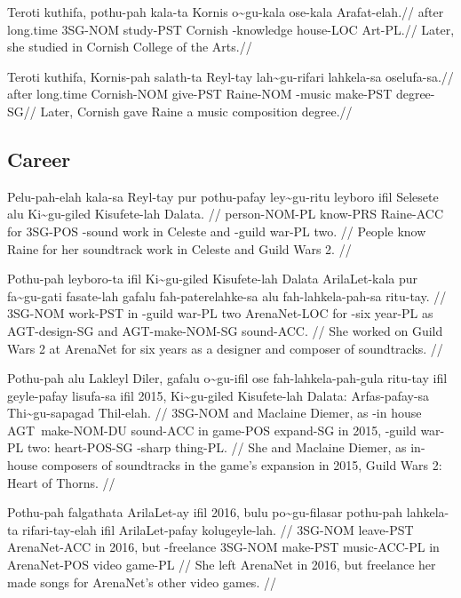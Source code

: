 \ex
\begingl
\gla  Teroti kuthifa,  pothu-pah kala-ta  Kornis o\~{}gu-kala ose-kala  Arafat-elah.//
\glb  after  long.time 3SG-NOM study-PST Cornish \agradj-knowledge house-LOC Art-PL.//
\glft Later, she studied in Cornish College of the Arts.//
\endgl
\xe

\ex
\begingl
\gla  Teroti kuthifa,  Kornis-pah salath-ta Reyl-tay  lah\~{}gu-rifari lahkela-sa oselufa-sa.//
\glb  after  long.time Cornish-NOM give-PST Raine-NOM  \agradj-music make-PST degree-SG//
\glft Later, Cornish gave Raine a music composition degree.//
\endgl
\xe

\subsection{Career}
\ex
\begingl
\gla Pelu-pah-elah kala-sa Reyl-tay pur pothu-pafay ley\~{}gu-ritu leyboro ifil Selesete alu Ki\~{}gu-giled Kisufete-lah Dalata. //
\glb person-NOM-PL know-PRS Raine-ACC for 3SG-POS \agradj-sound work in Celeste and \agradj-guild war-PL two. //
\glft People know Raine for her soundtrack work in Celeste and Guild Wars 2. //
\endgl
\xe

\ex
\begingl
\gla Pothu-pah leyboro-ta ifil Ki\~{}gu-giled Kisufete-lah Dalata  ArilaLet-kala pur fa\~{}gu-gati fasate-lah gafalu  fah-paterelahke-sa alu fah-lahkela-pah-sa  ritu-tay. //
\glb 3SG-NOM work-PST in \agradj-guild war-PL two  ArenaNet-LOC for \agradj-six year-PL as  AGT-design-SG and AGT-make-NOM-SG  sound-ACC. //
\glft She worked on Guild Wars 2 at ArenaNet for six years as a designer and composer of soundtracks. //
\endgl
\xe

\ex
\begingl
\gla Pothu-pah alu Lakleyl Diler, gafalu o\~{}gu-ifil ose fah-lahkela-pah-gula  ritu-tay ifil  geyle-pafay lisufa-sa ifil 2015, Ki\~{}gu-giled Kisufete-lah Dalata: Arfas-pafay-sa  Thi\~{}gu-sapagad Thil-elah. //
\glb 3SG-NOM and Maclaine Diemer, as \agradj-in house AGT~make-NOM-DU  sound-ACC in  game-POS expand-SG in 2015, \agradj-guild war-PL two: heart-POS-SG  \agradj-sharp thing-PL. //
\glft She and Maclaine Diemer, as in-house composers of soundtracks in the game's expansion in 2015, Guild Wars 2: Heart of Thorns. //
\endgl
\xe

\ex
\begingl
\gla Pothu-pah falgathata ArilaLet-ay ifil 2016, bulu po\~{}gu-filasar pothu-pah lahkela-ta rifari-tay-elah ifil ArilaLet-pafay   kolugeyle-lah. //
\glb 3SG-NOM leave-PST ArenaNet-ACC in 2016, but \agradj-freelance 3SG-NOM make-PST music-ACC-PL in ArenaNet-POS  video game-PL //
\glft She left ArenaNet in 2016, but freelance her made songs for ArenaNet's other video games. //
\endgl
\xe

